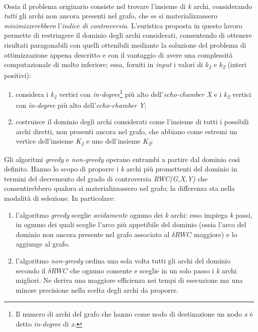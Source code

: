 \\
Ossia il problema originario consiste nel trovare l'insieme di \textit{k} archi, considerando \textit{tutti} gli archi non ancora presenti nel grafo, che se si materializzassero \textit{minimizzerebbero} l'\textit{indice di controversia}.
L'euristica proposta in questo lavoro permette di restringere il dominio degli archi considerati, consentendo di ottenere risultati paragonabili con quelli ottenibili mediante la soluzione del problema di ottimizzazione appena descritto e con il vantaggio di avere una complessità computazionale di molto inferiore; essa, forniti in \textit{input} i valori di \textit{k\textsubscript{1}} e \textit{k\textsubscript{2}} (interi positivi):
\begin{enumerate}
\item considera i \textit{k\textsubscript{1}} vertici con \textit{in-degree}\footnote{Il numero di archi del grafo che hanno come nodo di destinazione un nodo \textit{x} è detto \textit{in-degree} di \textit{x}.} più alto dell'\textit{echo-chamber X} e i \textit{k\textsubscript{2}} vertici con \textit{in-degree} più alto dell'\textit{echo-chamber Y};
\item costruisce il dominio degli archi considerati come l'insieme di tutti i possibili archi diretti, non presenti ancora nel grafo, che abbiano come estremi un vertice dell'insieme \textit{K\textsubscript{1}} e uno dell'insieme \textit{K\textsubscript{2}};  
\end{enumerate}
Gli algoritmi \textit{greedy} e \textit{non-greedy} operano entrambi a partire dal dominio così definito. Hanno lo scopo di proporre i \textit{k} archi più promettenti del dominio in termini del decremento del grado di controversia \textit{RWC(G,X,Y)} che consentirebbero qualora si materializzassero nel grafo; la differenza sta nella modalità di selezione. In particolare:
\begin{enumerate}
\item l'algoritmo \textit{greedy} sceglie \textit{avidamente} ognuno dei \textit{k} archi: esso impiega \textit{k} passi, in ognuno dei quali sceglie l'arco più appetibile del dominio (ossia l'arco del dominio non ancora presente nel grafo associato al $\delta RWC$ maggiore) e lo aggiunge al grafo.
\item l'algoritmo \textit{non-greedy} ordina una sola volta tutti gli archi del dominio secondo il $\delta RWC$ che ognuno consente e sceglie in un solo passo i \textit{k} archi migliori. Ne deriva una maggiore efficienza nei tempi di esecuzione ma una minore precisione nella scelta degli archi da proporre.
\end{enumerate}
